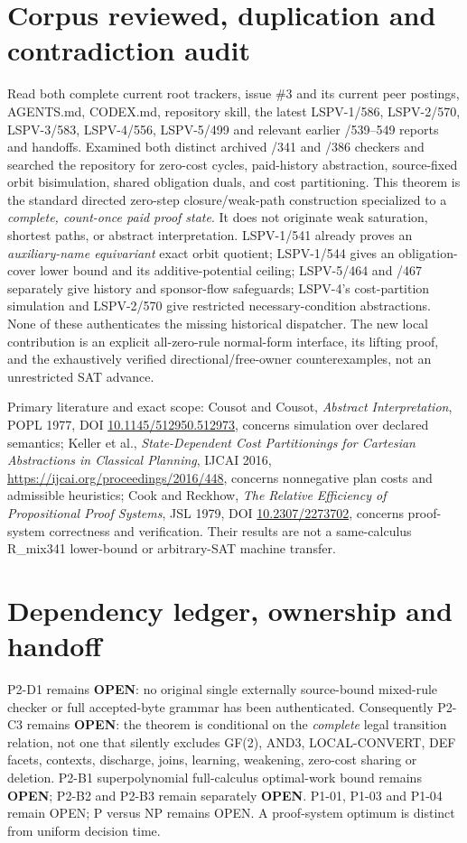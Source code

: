 \documentclass[11pt]{article}
\begin{document}
\section*{Corpus reviewed, duplication and contradiction audit}
Read both complete current root trackers, issue \#3 and its current peer postings, AGENTS.md, CODEX.md, repository skill, the latest LSPV-1/586, LSPV-2/570, LSPV-3/583, LSPV-4/556, LSPV-5/499 and relevant earlier /539--549 reports and handoffs. Examined both distinct archived /341 and /386 checkers and searched the repository for zero-cost cycles, paid-history abstraction, source-fixed orbit bisimulation, shared obligation duals, and cost partitioning. This theorem is the standard directed zero-step closure/weak-path construction specialized to a \emph{complete, count-once paid proof state}. It does not originate weak saturation, shortest paths, or abstract interpretation. LSPV-1/541 already proves an \emph{auxiliary-name equivariant} exact orbit quotient; LSPV-1/544 gives an obligation-cover lower bound and its additive-potential ceiling; LSPV-5/464 and /467 separately give history and sponsor-flow safeguards; LSPV-4's cost-partition simulation and LSPV-2/570 give restricted necessary-condition abstractions. None of these authenticates the missing historical dispatcher. The new local contribution is an explicit all-zero-rule normal-form interface, its lifting proof, and the exhaustively verified directional/free-owner counterexamples, not an unrestricted SAT advance.

Primary literature and exact scope: Cousot and Cousot, \emph{Abstract Interpretation}, POPL 1977, DOI \href{https://doi.org/10.1145/512950.512973}{10.1145/512950.512973}, concerns simulation over declared semantics; Keller et al., \emph{State-Dependent Cost Partitionings for Cartesian Abstractions in Classical Planning}, IJCAI 2016, \url{https://ijcai.org/proceedings/2016/448}, concerns nonnegative plan costs and admissible heuristics; Cook and Reckhow, \emph{The Relative Efficiency of Propositional Proof Systems}, JSL 1979, DOI \href{https://doi.org/10.2307/2273702}{10.2307/2273702}, concerns proof-system correctness and verification. Their results are not a same-calculus R\_mix341 lower-bound or arbitrary-SAT machine transfer.

\section*{Dependency ledger, ownership and handoff}
P2-D1 remains \textbf{OPEN}: no original single externally source-bound mixed-rule checker or full accepted-byte grammar has been authenticated. Consequently P2-C3 remains \textbf{OPEN}: the theorem is conditional on the \emph{complete} legal transition relation, not one that silently excludes GF(2), AND3, LOCAL-CONVERT, DEF facets, contexts, discharge, joins, learning, weakening, zero-cost sharing or deletion. P2-B1 superpolynomial full-calculus optimal-work bound remains \textbf{OPEN}; P2-B2 and P2-B3 remain separately \textbf{OPEN}. P1-01, P1-03 and P1-04 remain OPEN; P versus NP remains OPEN. A proof-system optimum is distinct from uniform decision time.
\end{document}
